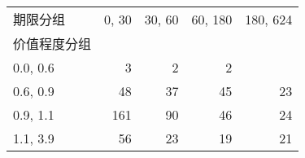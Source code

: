 \begin{tabular}{lrrrr}
\toprule
期限分组 &  0, 30 &  30, 60 &  60, 180 &  180, 624 \\
价值程度分组 &          &           &            &             \\
\midrule
0.0, 0.6    &        3 &         2 &          2 &             \\
0.6, 0.9    &       48 &        37 &         45 &          23 \\
0.9, 1.1    &      161 &        90 &         46 &          24 \\
1.1, 3.9    &       56 &        23 &         19 &          21 \\
\bottomrule
\end{tabular}
